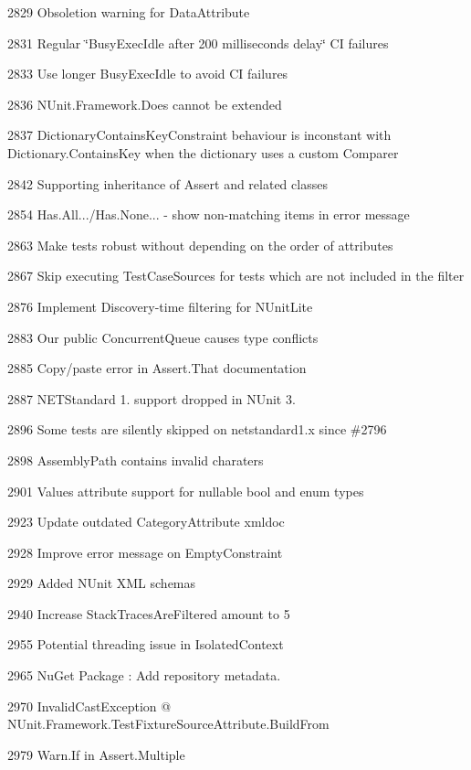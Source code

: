 \begin{DoxyItemize}
\item 2829 Obsoletion warning for Data\+Attribute
\item 2831 Regular \char`\"{}\+Busy\+Exec\+Idle after 200 milliseconds delay\char`\"{} CI failures
\item 2833 Use longer Busy\+Exec\+Idle to avoid CI failures
\item 2836 N\+Unit.\+Framework.\+Does cannot be extended
\item 2837 Dictionary\+Contains\+Key\+Constraint behaviour is inconstant with Dictionary.\+Contains\+Key when the dictionary uses a custom Comparer
\item 2842 Supporting inheritance of Assert and related classes
\item 2854 Has.\+All.../\+Has.None... -\/ show non-\/matching items in error message
\item 2863 Make tests robust without depending on the order of attributes
\item 2867 Skip executing Test\+Case\+Sources for tests which are not included in the filter
\item 2876 Implement Discovery-\/time filtering for N\+Unit\+Lite
\item 2883 Our public Concurrent\+Queue causes type conflicts
\item 2885 Copy/paste error in Assert.\+That documentation
\item 2887 N\+E\+T\+Standard 1. support dropped in N\+Unit 3.
\item 2896 Some tests are silently skipped on netstandard1.\+x since \#2796
\item 2898 Assembly\+Path contains invalid charaters
\item 2901 Values attribute support for nullable bool and enum types
\item 2923 Update outdated Category\+Attribute xmldoc
\item 2928 Improve error message on Empty\+Constraint
\item 2929 Added N\+Unit X\+ML schemas
\item 2940 Increase Stack\+Traces\+Are\+Filtered amount to 5
\item 2955 Potential threading issue in Isolated\+Context
\item 2965 Nu\+Get Package \+: Add {\ttfamily repository} metadata.
\item 2970 Invalid\+Cast\+Exception @ N\+Unit.\+Framework.\+Test\+Fixture\+Source\+Attribute.\+Build\+From
\item 2979 Warn.\+If in Assert.\+Multiple

\end{DoxyItemize}
